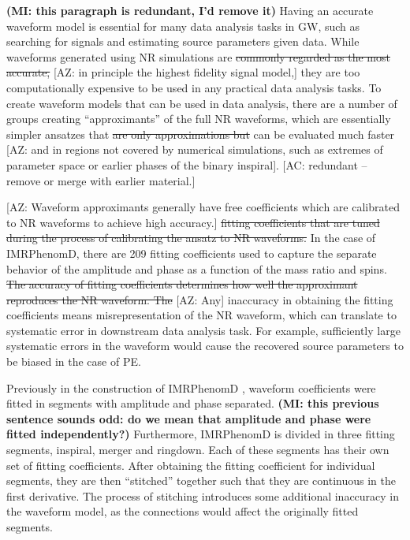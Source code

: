 \documentclass[twocolumn]{aastex631}
\newcommand{\AZ}[1]{{\color{Burnt}[AZ: #1]}}
\newcommand{\mi}[1]{\textbf{\color{teal}(MI: #1)}}
\newcommand{\amc}[1]{{\color{red}[AC: #1]}}
\begin{document}
\mi{this paragraph is redundant, I'd remove it}
Having an accurate waveform model is essential for many data analysis tasks in
GW, such as searching for signals and estimating source parameters given data.
While waveforms generated using NR simulations are \sout{commonly
regarded as the most accurate,} 
\AZ{in principle the highest fidelity signal model,}
they are too computationally expensive to be used
in any practical data analysis tasks. To create waveform models that can be used
in data analysis, there are a number of groups creating ``approximants'' of the
full NR waveforms, which are essentially simpler ansatzes that
\sout{are only approximations but} can be evaluated much faster \AZ{and in regions not
covered by numerical simulations, such as extremes of parameter space or earlier 
phases of the binary inspiral}. 
\amc{redundant -- remove or merge with earlier material.}

\AZ{Waveform approximants generally have free coefficients which are calibrated
to NR waveforms to achieve high accuracy.}
\sout{ fitting coefficients that are tuned during
the process of calibrating the ansatz to NR waveforms.} In the case of
IMRPhenomD, there are 209 fitting coefficients used to capture the separate
behavior of the amplitude and phase as a function of the mass ratio and spins.
\sout{The accuracy of fitting coefficients determines how well the approximant
reproduces the NR waveform. 
The}
\AZ{Any} inaccuracy in obtaining the fitting coefficients
means misrepresentation of the NR waveform, which can translate to systematic
error in downstream data analysis task. For example, sufficiently large
systematic errors in the waveform would cause the recovered source parameters to be biased
in the case of PE.

Previously in the construction of IMRPhenomD \citep{Khan:2015jqa}, waveform
coefficients were fitted in segments with amplitude and phase separated.
\mi{this previous sentence sounds odd: do we mean that amplitude and phase were fitted independently?}
Furthermore, IMRPhenomD is divided in three fitting segments, inspiral, merger and ringdown.
Each of these segments has their own set of fitting coefficients.
After obtaining the fitting coefficient for individual segments, they are then ``stitched'' together such that they are continuous in the first derivative.
The process of stitching introduces some additional
inaccuracy in the waveform model, as the connections would affect the originally
fitted segments.
\end{document}

